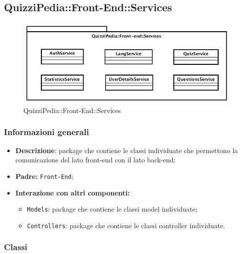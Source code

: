 \newpage
\subsection{QuizziPedia::Front-End::Services}
\begin{figure}[ht]
	\centering
	\includegraphics[scale=0.60]{UML/Package/QuizziPedia_Front-End_Services.png}
	\caption{QuizziPedia::Front-End::Services}
\end{figure} \FloatBarrier
\subsubsection{Informazioni generali}
\begin{itemize}
	\item \textbf{Descrizione}: package che contiene le classi individuate che permettono la comunicazione del lato front-end con il lato back-end;
	\item \textbf{Padre:} \texttt{Front-End};
	\item \textbf{Interazione con altri componenti:}
	\begin{itemize}
		\item \texttt{Models}: package che contiene le classi model individuate;
		\item \texttt{Controllers}: package che contiene le classi controller individuate.
	\end{itemize} 
\end{itemize}
\subsubsection{Classi}









